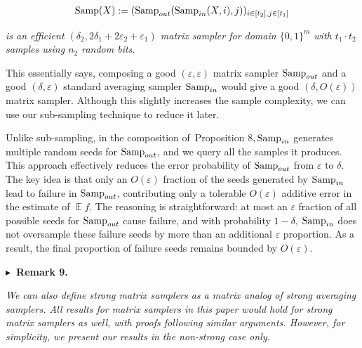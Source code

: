 \[\begin{gathered}
\textup{{Samp}}(X):=(\textup{{Samp}}_{out}(\textup{{Samp}}_{in}(X,i),j))_{i\in[t_{2}],j\in[t_{1}]}
\end{gathered}\]


\emph{is an efficient $(\delta_{2},2\delta_{1}+2\varepsilon_{2}+\varepsilon_{1})$ matrix sampler for domain $\{0,1\}^{m}$ with $t_{1}\cdot t_{2}$ samples using $n_{2}$ random bits.}\par






This essentially says, composing a good $(\varepsilon,\varepsilon)$ matrix sampler $\textup{{Samp}}_{out}$ and a good $(\delta,\varepsilon)$ standard averaging sampler $\textup{{Samp}}_{in}$ would give a good $(\delta,O(\varepsilon))$ matrix sampler. Although this slightly increases the sample complexity, we can use our sub-sampling technique to reduce it later.\par




Unlike sub-sampling, in the composition of Proposition 8$,\textup{{Samp}}_{in}$ generates multiple random seeds for $\textup{{Samp}}_{out}$, and we query all the samples it produces. This approach effectively reduces the error probability of $\textup{{Samp}}_{out}$ from $\varepsilon$ to $\delta$. The key idea is that only an $O(\varepsilon)$ fraction of the seeds generated by $\textup{{Samp}}_{in}$ lead to failure in $\textup{{Samp}}_{out}$, contributing only a tolerable $O(\varepsilon)$ additive error in the estimate of $\operatorname*{\mathbb{E}}f$. The reasoning is straightforward: at most an $\varepsilon$ fraction of all possible seeds for $\textup{{Samp}}_{out}$ cause failure, and with probability $1-\delta$, $\textup{{Samp}}_{in}$ does not oversample these failure seeds by more than an additional $\varepsilon$ proportion. As a result, the final proportion of failure seeds remains bounded by $O(\varepsilon)$.\par





\par\medskip\noindent\textbf{
$\blacktriangleright$ Remark 9.
}\par



\emph{We can also define strong matrix samplers as a matrix analog of strong averaging samplers. All results for matrix samplers in this paper would hold for strong matrix samplers as well, with proofs following similar arguments. However, for simplicity, we present our results in the non-strong case only.}\par



